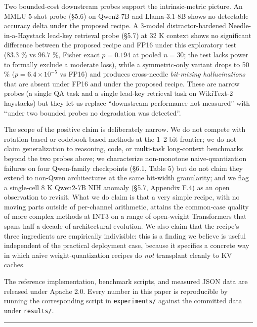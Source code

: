 Two bounded-cost downstream probes support the intrinsic-metric picture.
An MMLU 5-shot probe (§5.6) on Qwen2-7B and Llama-3.1-8B shows no
detectable accuracy delta under the proposed recipe. A 3-model
distractor-hardened Needle-in-a-Haystack lead-key retrieval probe (§5.7)
at 32 K context shows no significant difference between the proposed
recipe and FP16 under this exploratory test (83.3 \% vs 96.7 \%, Fisher
exact \(p = 0.194\) at pooled \(n = 30\); the test lacks power to
formally exclude a moderate loss), while a symmetric-only variant drops
to 50 \% (\(p = 6.4 \times 10^{-5}\) vs FP16) and produces cross-needle
\emph{bit-mixing hallucinations} that are absent under FP16 and under
the proposed recipe. These are narrow probes (a single QA task and a
single lead-key retrieval task on WikiText-2 haystacks) but they let us
replace ``downstream performance not measured'' with ``under two bounded
probes no degradation was detected''.

The scope of the positive claim is deliberately narrow. We do not
compete with rotation-based or codebook-based methods at the 1--2 bit
frontier; we do not claim generalization to reasoning, code, or
multi-task long-context benchmarks beyond the two probes above; we
characterize non-monotone naive-quantization failures on four
Qwen-family checkpoints (§6.1, Table 5) but do not claim they extend to
non-Qwen architectures at the same bit-width granularity; and we flag a
single-cell 8 K Qwen2-7B NIH anomaly (§5.7, Appendix F.4) as an open
observation to revisit. What we do claim is that a very simple recipe,
with no moving parts outside of per-channel arithmetic, attains the
common-case quality of more complex methods at INT3 on a range of
open-weight Transformers that spans half a decade of architectural
evolution. We also claim that the recipe's three ingredients are
empirically indivisible: this is a finding we believe is useful
independent of the practical deployment case, because it specifies a
concrete way in which naive weight-quantization recipes do \emph{not}
transplant cleanly to KV caches.

The reference implementation, benchmark scripts, and measured JSON data
are released under Apache 2.0. Every number in this paper is
reproducible by running the corresponding script in
\texttt{experiments/} against the committed data under
\texttt{results/}.

\begin{center}\rule{0.5\linewidth}{0.5pt}\end{center}

